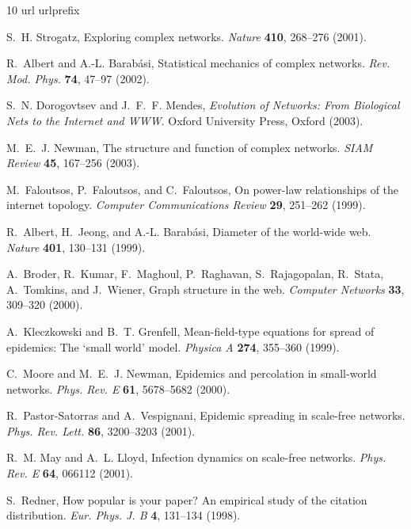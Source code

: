\documentclass[twocolumn,pre,superscriptaddress]{revtex4}
\begin{document}
\begin{thebibliography}{10}
\expandafter\ifx\csname url\endcsname\relax
  \def\url#1{\texttt{#1}}\fi
\expandafter\ifx\csname urlprefix\endcsname\relax\def\urlprefix{URL }\fi

S.~H. Strogatz, Exploring complex networks. \textit{Nature} \textbf{410},
  268--276 (2001).

R.~Albert and A.-L. Barab\'asi, Statistical mechanics of complex networks.
  \textit{Rev. Mod. Phys.} \textbf{74}, 47--97 (2002).

S.~N. Dorogovtsev and J.~F.~F. Mendes, \textit{Evolution of Networks: From
  Biological Nets to the Internet and WWW}. Oxford University Press, Oxford
  (2003).

M.~E.~J. Newman, The structure and function of complex networks. \textit{SIAM
  Review} \textbf{45}, 167--256 (2003).

M.~Faloutsos, P.~Faloutsos, and C.~Faloutsos, On power-law relationships of the
  internet topology. \textit{Computer Communications Review} \textbf{29},
  251--262 (1999).

R.~Albert, H.~Jeong, and A.-L. Barab\'asi, Diameter of the world-wide web.
  \textit{Nature} \textbf{401}, 130--131 (1999).

A.~Broder, R.~Kumar, F.~Maghoul, P.~Raghavan, S.~Rajagopalan, R.~Stata,
  A.~Tomkins, and J.~Wiener, Graph structure in the web. \textit{Computer
  Networks} \textbf{33}, 309--320 (2000).

A.~Kleczkowski and B.~T. Grenfell, Mean-field-type equations for spread of
  epidemics: The `small world' model. \textit{Physica A} \textbf{274}, 355--360
  (1999).

C.~Moore and M.~E.~J. Newman, Epidemics and percolation in small-world
  networks. \textit{Phys. Rev. E} \textbf{61}, 5678--5682 (2000).

R.~Pastor-Satorras and A.~Vespignani, Epidemic spreading in scale-free
  networks. \textit{Phys. Rev. Lett.} \textbf{86}, 3200--3203 (2001).

R.~M. May and A.~L. Lloyd, Infection dynamics on scale-free networks.
  \textit{Phys. Rev. E} \textbf{64}, 066112 (2001).

S.~Redner, How popular is your paper? {A}n empirical study of the citation
  distribution. \textit{Eur. Phys. J. B} \textbf{4}, 131--134 (1998).


\end{thebibliography}
\end{document}
